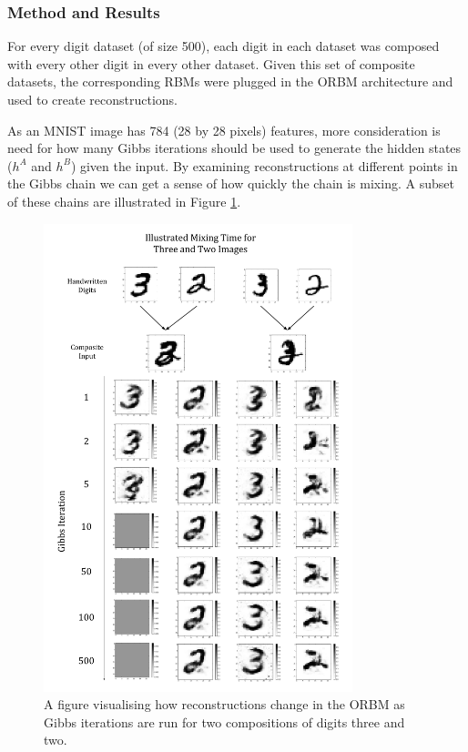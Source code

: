   \subsubsection{Method and Results}

  For every digit dataset (of size 500), each digit in each dataset was composed with every other digit in every other dataset. Given this set of composite datasets, the corresponding RBMs were plugged in the ORBM architecture and used to create reconstructions.

  As an MNIST image has 784 (28 by 28 pixels) features, more consideration is need for how many Gibbs iterations should be used to generate the hidden states ($h^A$ and $h^B$) given the input. By examining reconstructions at different points in the Gibbs chain we can get a sense of how quickly the chain is mixing. A subset of these chains are illustrated in Figure \ref{F:MNIST-Mixing-Time}.
  \begin{figure}[htb]
    \begin{center}
      \includegraphics[width=0.8\textwidth]{Assets/results/Mixing-Results.png}
    \end{center}
    \caption{A figure visualising how reconstructions change in the ORBM as Gibbs iterations are run for two compositions of digits three and two.}
    \label{F:MNIST-Mixing-Time}
  \end{figure}
